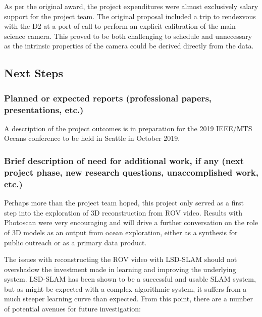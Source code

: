 \documentclass[letterpaper,12pt]{article}
\begin{document}
\vspace{12pt}
\noindent
As per the original award, the project expenditures were almost exclusively salary support for the project team.  The original proposal included a trip to rendezvous with the D2 at a port of call to perform an explicit calibration of the main science camera.  This proved to be both challenging to schedule and unnecessary as the intrinsic properties of the camera could be derived directly from the data.

\subsection{Next Steps}
\subsubsection*{Planned or expected reports (professional papers, presentations, etc.)}

A description of the project outcomes is in preparation for the 2019 IEEE/MTS Oceans conference to be held in Seattle in October 2019.

\subsubsection*{Brief description of need for additional work, if any (next project phase, new research questions, unaccomplished work, etc.)}

Perhaps more than the project team hoped, this project only served as a first step into the exploration of 3D reconstruction from ROV video.  Results with Photoscan were very encouraging and will drive a further conversation on the role of 3D models as an output from ocean exploration, either as a synthesis for public outreach or as a primary data product.     

The issues with reconstructing the ROV video with LSD-SLAM should not overshadow the investment made in learning and improving the underlying system.   LSD-SLAM has been shown to be a successful and usable SLAM system, but as might be expected with a complex algorithmic system, it suffers from a much steeper learning curve than expected.   
From this point, there are a number of potential avenues for future investigation:
\end{document}
